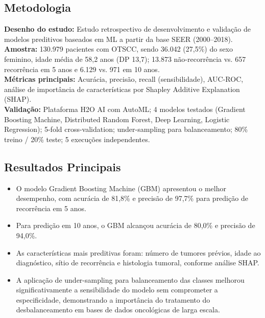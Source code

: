\subsection{Metodologia}
\textbf{Desenho do estudo:} Estudo retrospectivo de desenvolvimento e
validação de modelos preditivos baseados em ML a partir da base SEER
(2000--2018). \\
\textbf{Amostra:} 130.979 pacientes com OTSCC, sendo 36.042 (27,5\%) do
sexo feminino, idade média de 58,2 anos (DP 13,7); 13.873 não-recorrência
vs. 657 recorrência em 5 anos e 6.129 vs. 971 em 10 anos. \\
\textbf{Métricas principais:} Acurácia, precisão, recall (sensibilidade),
AUC-ROC, análise de importância de características por Shapley Additive
Explanation (SHAP). \\
\textbf{Validação:} Plataforma H2O AI com AutoML; 4 modelos testados
(Gradient Boosting Machine, Distributed Random Forest, Deep Learning,
Logistic Regression); 5-fold cross-validation; under-sampling para
balanceamento; 80\% treino / 20\% teste; 5 execuções independentes.

\subsection{Resultados Principais}
\begin{itemize}
  \item O modelo Gradient Boosting Machine (GBM) apresentou o melhor
        desempenho, com acurácia de 81,8\% e precisão de 97,7\% para
        predição de recorrência em 5 anos.
  \item Para predição em 10 anos, o GBM alcançou acurácia de 80,0\%
        e precisão de 94,0\%.
  \item As características mais preditivas foram: número de tumores
        prévios, idade ao diagnóstico, sítio de recorrência e
        histologia tumoral, conforme análise SHAP.
  \item A aplicação de under-sampling para balanceamento das classes
        melhorou significativamente a sensibilidade do modelo sem
        comprometer a especificidade, demonstrando a importância do
        tratamento do desbalanceamento em bases de dados oncológicas
        de larga escala.
\end{itemize}

